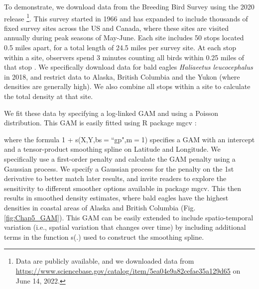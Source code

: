 To demonstrate, we download data from the Breeding Bird Survey \cite{sauer_north_1997} using the 2020 release \cite{pardieck_north_2019}\footnote{Data are publicly available, and we downloaded data from \url{https://www.sciencebase.gov/catalog/item/5ea04e9a82cefae35a129d65} on June 14, 2022.}.  This survey started in 1966 and has expanded to include thousands of fixed survey sites across the US and Canada, where these sites are visited annually during peak seasons of May-June.  Each site includes 50 stops located 0.5 miles apart, for a total length of 24.5 miles per survey site.  At each stop within a site, observers spend 3 minutes counting all birds within 0.25 miles of that stop .  We specifically download data for bald eagles \textit{Haliaeetus leucocephalus} in 2018, and restrict data to Alaska, British Columbia and the Yukon (where densities are generally high).  We also combine all stops within a site to calculate the total density at that site.  

We fit these data by specifying a log-linked GAM and using a Poisson distribution.  This GAM is easily fitted using R package \colorbox{backcolour}{mgcv} \cite{wood_fast_2011}:

\lstset{style=Rcode}

where the formula \colorbox{backcolour}{1 + s(X,Y,bs$=$``gp",m$=$1)} specifies a GAM with an intercept and a tensor-product smoothing spline on Latitude and Longitude. We specifically use a first-order penalty and calculate the GAM penalty using a Gaussian process. We specify a Gaussian process for the penalty on the 1st derivative to better match later results, and invite readers to explore the sensitivity to different smoother options available in package \colorbox{backcolour}{mgcv}. This then results in smoothed density estimates, where bald eagles have the highest densities in coastal areas of Alaska and British Columbia (Fig. \ref{fig:Chap5_GAM}).  This GAM can be easily extended to include spatio-temporal variation (i.e., spatial variation that changes over time) by including additional terms in the function \colorbox{backcolour}{s(.)} used to construct the smoothing spline.  


